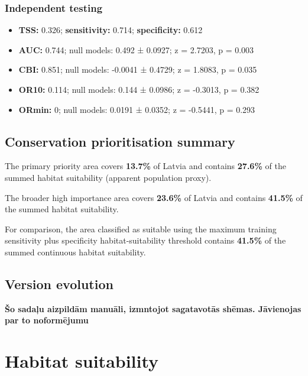 \documentclass[
  openany]{book}
\providecommand{\tightlist}{%
  \setlength{\itemsep}{0pt}\setlength{\parskip}{0pt}}
\providecommand{\tightlist}{%
  \setlength{\itemsep}{0pt}%
  \setlength{\parskip}{0pt}%
}
\begin{document}
\subsubsection*{Independent testing}\label{independent-testing-1}

\begin{itemize}
\tightlist
\item
  \textbf{TSS:} 0.326; \textbf{sensitivity:} 0.714; \textbf{specificity:} 0.612
\item
  \textbf{AUC:} 0.744; null models: 0.492 ± 0.0927; z = 2.7203, p = 0.003
\item
  \textbf{CBI:} 0.851; null models: -0.0041 ± 0.4729; z = 1.8083, p = 0.035
\item
  \textbf{OR10:} 0.114; null models: 0.144 ± 0.0986; z = -0.3013, p = 0.382
\item
  \textbf{ORmin:} 0; null models: 0.0191 ± 0.0352; z = -0.5441, p = 0.293
\end{itemize}

\subsection*{Conservation prioritisation summary}\label{conservation-prioritisation-summary-1}

The primary priority area covers \textbf{13.7\%} of Latvia and contains \textbf{27.6\%} of the summed habitat suitability (apparent population proxy).

The broader high importance area covers \textbf{23.6\%} of Latvia and contains \textbf{41.5\%} of the summed habitat suitability.

For comparison, the area classified as suitable using the maximum training sensitivity plus specificity habitat-suitability threshold contains \textbf{41.5\%} of the summed continuous habitat suitability.

\subsection*{Version evolution}\label{version-evolution-1}

\textbf{Šo sadaļu aizpildām manuāli, izmntojot sagatavotās shēmas. Jāvienojas par to noformējumu}

\section*{Habitat suitability}\label{habitat-suitability-1}
\end{document}

